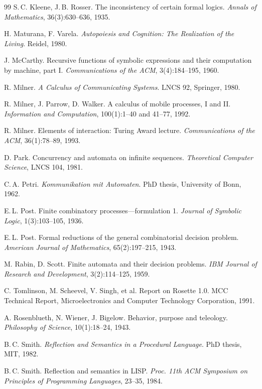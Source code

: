 \begin{thebibliography}{99}
S.\,C. Kleene, J.\,B. Rosser. The inconsistency of
certain formal logics. \emph{Annals of Mathematics}, 36(3):630--636, 1935.

H. Maturana, F. Varela. \emph{Autopoiesis and Cognition:
The Realization of the Living}. Reidel, 1980.

J. McCarthy. Recursive functions of symbolic expressions and
their computation by machine, part I. \emph{Communications of the ACM},
3(4):184--195, 1960.

R. Milner. \emph{A Calculus of Communicating Systems}. LNCS
92, Springer, 1980.

R. Milner, J. Parrow, D. Walker. A calculus of mobile
processes, I and II. \emph{Information and Computation}, 100(1):1--40 and 41--77,
1992.

R. Milner. Elements of interaction: Turing Award lecture.
\emph{Communications of the ACM}, 36(1):78--89, 1993.

D. Park. Concurrency and automata on infinite sequences.
\emph{Theoretical Computer Science}, LNCS 104, 1981.

C.\,A. Petri. \emph{Kommunikation mit Automaten}. PhD thesis,
University of Bonn, 1962.

E.\,L. Post. Finite combinatory processes---formulation 1.
\emph{Journal of Symbolic Logic}, 1(3):103--105, 1936.

E.\,L. Post. Formal reductions of the general combinatorial
decision problem. \emph{American Journal of Mathematics}, 65(2):197--215, 1943.

M. Rabin, D. Scott. Finite automata and their decision
problems. \emph{IBM Journal of Research and Development}, 3(2):114--125, 1959.

C. Tomlinson, M. Scheevel, V. Singh, et al. Report on
Rosette 1.0. MCC Technical Report, Microelectronics and Computer Technology
Corporation, 1991.

A. Rosenblueth, N. Wiener, J. Bigelow. Behavior, purpose and
teleology. \emph{Philosophy of Science}, 10(1):18--24, 1943.

B.\,C. Smith. \emph{Reflection and Semantics in a Procedural
Language}. PhD thesis, MIT, 1982.

B.\,C. Smith. Reflection and semantics in LISP. \emph{Proc.
11th ACM Symposium on Principles of Programming Languages}, 23--35, 1984.


\end{thebibliography}
